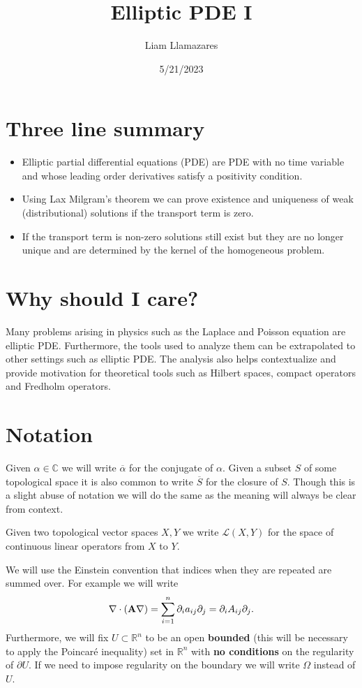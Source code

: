 \documentclass[
    a4paper,
    DIV=14,
    abstract=true,
    numbers=noenddot
]
{scrartcl}
\theoremstyle{definition}
\newcommand{\C}{\mathbb{C}}
\newcommand{\R}{\mathbb{R}}
\newcommand{\Ll}{\mathcal{L}}
\begin{document}
\title{Elliptic PDE I}
\author{Liam Llamazares}
\date{5/21/2023}
\maketitle
\section{ Three line summary}
\begin{itemize}
	\item Elliptic partial differential equations (PDE) are PDE with no time variable and whose leading order derivatives satisfy a positivity condition.
	\item Using Lax Milgram's theorem we can prove existence and uniqueness of weak (distributional) solutions if the transport term is zero.
	\item If the transport term is non-zero solutions still exist but they are no longer unique and are determined by the kernel of the homogeneous problem.\end{itemize}
\section{Why should I care?}
Many problems arising in physics such as the Laplace and Poisson equation are elliptic PDE. Furthermore, the tools used to analyze them can be extrapolated to other settings such as
elliptic PDE. The analysis also helps contextualize and provide motivation for theoretical tools such as Hilbert spaces, compact operators and Fredholm operators.
\section{Notation}
Given $\alpha \in \C$ we will write $\overline{\alpha }$ for the conjugate of $\alpha $. Given a subset $S$ of some topological space it is also common to write  $\overline{S}$ for the closure of $S$. Though this is a slight abuse of notation we will do the same as the meaning will always be clear from context.

Given two topological vector spaces $X,Y$ we write  $\Ll(X,Y)$ for the space of continuous linear operators from $X$ to  $Y$.

We will use the Einstein convention that indices when they are repeated are summed over. For example we will write
\begin{align*}
	\nabla \cdot (\vb{A}\nabla)=\sum_{i=1}^n \partial_i a_{ij} \partial _j =\partial_i A_{ij} \partial _j.
\end{align*}
Furthermore, we will fix $U \subset \R^n$ to be an open \textbf{bounded} (this will be necessary to apply the Poincaré inequality) set in $\R^n$ with \textbf{no conditions} on the regularity of $\partial U$. If we need to impose regularity on the boundary we will write $\Omega$ instead of $U$.
\end{document}
